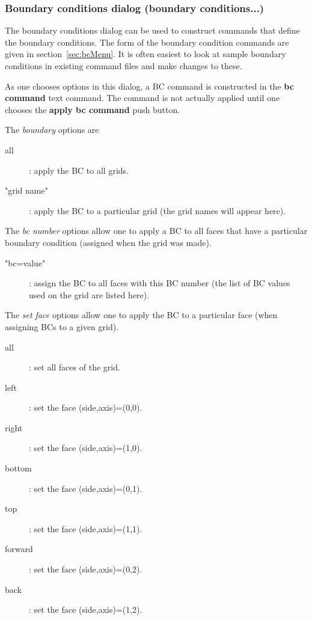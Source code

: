 \subsubsection{Boundary conditions dialog (boundary conditions...)}\label{sec:boundaryConditionsOptions}

The boundary conditions dialog can be used to construct commands that define the boundary conditions. 
The form of the boundary condition commands are given in section~\ref{sec:bcMenu}. 
It is often easiest to look at sample boundary conditions in existing command files and make changes to these.

As one chooses options in this dialog, a BC command is constructed in the {\bf bc command} text command. 
The command is not actually applied until one chooses the {\bf apply bc command} push button.


\noindent The {\em boundary} options are
\begin{description}
  \item[\qquad all] : apply the BC to all grids. 
  \item[\qquad "grid name"] : apply the BC to a particular grid (the grid names will appear here).
\end{description}


\noindent The {\em bc number} options allow one to apply a BC to all faces that have a particular boundary condition (assigned
when the grid was made).
\begin{description}
  \item[\qquad "bc=value"] : assign the BC to all faces with this BC number (the list of BC values used on the grid are listed here).
\end{description}

\noindent The {\em set face} options allow one to apply the BC to a particular face (when assigning BCs to a given grid).
\begin{description}
  \item[\qquad all] : set all faces of the grid.
  \item[\qquad left] :  set the face (side,axis)=(0,0). 
  \item[\qquad right] : set the face (side,axis)=(1,0). 
  \item[\qquad bottom] : set the face (side,axis)=(0,1). 
  \item[\qquad top] : set the face (side,axis)=(1,1). 
  \item[\qquad forward] : set the face (side,axis)=(0,2). 
  \item[\qquad back] : set the face (side,axis)=(1,2). 
\end{description}

